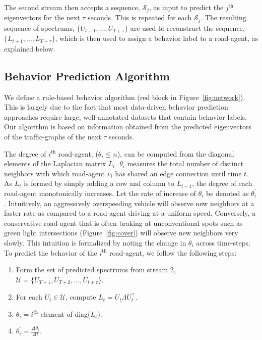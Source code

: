\documentclass[10pt,twocolumn,letterpaper]{article}
\newcommand{\mc}[1]{\mathcal{#1}}
\theoremstyle{plain}
\begin{document}
The second stream then accepts a sequence, $\mc{S}_j$, as input to predict the $j^{\textrm{th}}$ eigenvectors for the next $\tau$ seconds. This is repeated for each $\mc{S}_j$. The resulting sequence of spectrums, $\{U_{t+1}, \ldots, U_{T+\tau}\}$ are used to reconstruct the sequence, $\{L_{t+1}, \ldots, L_{T+\tau}\}$, which is then used to assign a behavior label to a road-agent, as explained below.

\subsection{Behavior Prediction Algorithm}
\label{subsec: behavior_protocol}
We define a rule-based behavior algorithm (red block in Figure~\ref{fig:network}). This is largely due to the fact that most data-driven behavior prediction approaches require large, well-annotated datasets that contain behavior labels. Our algorithm is based on information obtained from the predicted eigenvectors of the traffic-graphs of the next $\tau$ seconds.



The degree of $i^{\textrm{th}}$ road-agent, ($\theta_i \leq n$), can be computed from the diagonal elements of the Laplacian matrix $L_t$. $\theta_i$ measures the total number of distinct neighbors with which road-agent $v_i$ has shared an edge connection until time $t$. As $L_t$ is formed by simply adding a row and column to $L_{t-1}$, the degree of each road-agent monotonically increases. Let the rate of increase of $\theta_i$ be denoted as $\theta_i^{'}$. Intuitively, an aggressively overspeeding vehicle will observe new neighbors at a faster rate as compared to a road-agent driving at a uniform speed. Conversely, a conservative road-agent that is often braking at unconventional spots such as green light intersections (Figure~\ref{fig:cover}) will observe new neighbors very slowly. This intuition is formalized by noting the change in $\theta_i$ across time-steps. To predict the behavior of the $i^{\textrm{th}}$ road-agent, we follow the following steps:

\begin{enumerate}[noitemsep]
    \item Form the set of predicted spectrums from stream 2, $\mc{U}= \{ U_{T+1}, U_{T+2}, \dots, U_{t+\tau} \}$.
    \item For each $U_t \in \mc{U}$, compute $L_t = U_t\Lambda U_t^\top$.
    \item $\theta_i = i^{\textrm{th}}$ element of diag($L_t$).
    \item $\theta_i^{'} = \frac{\Delta \theta_i}{\Delta t}$.
\end{enumerate}
\end{document}
